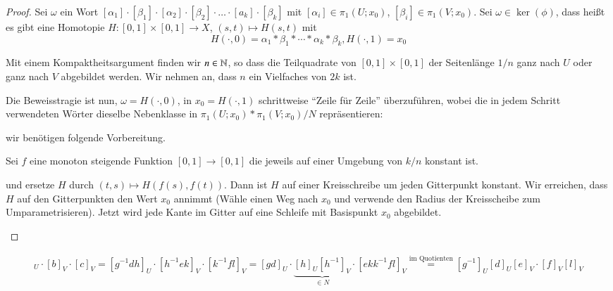 \documentclass[a4paper,10pt]{scrartcl}
\begin{document}
\begin{proof}
 Sei $\omega$ ein Wort $[\alpha_1]\cdot[\beta_1]\cdot[\alpha_2]\cdot[\beta_2]\cdot\dotsc\cdot[a_k]\cdot[\beta_k]$ mit $[\alpha_i]\in \pi_1(U;x_0)$, $[\beta_i]\in \pi_1(V;x_0)$. Sei $\omega\in \ker(\phi)$, dass heißt es gibt eine Homotopie 
$H:[0,1]\times[0,1]\to X$, $(s,t)\mapsto H(s,t)$ mit 
\[
 H(\cdot, 0)=\alpha_1*\beta_1*\dotsb *\alpha_k*\beta_k, H(\cdot, 1)=x_0
\]
\begin{figure}[H]
 \centering
\fixme[fig110]
\caption{}
\end{figure}
Mit einem Kompaktheitsargument finden wir $n\in \mathbb{N}$, so dass die Teilquadrate von $[0,1]\times[0,1]$ der Seitenlänge $1/n$ ganz nach $U$ oder ganz nach $V$ abgebildet werden. Wir nehmen an, dass $n$ ein Vielfaches von $2k$ ist.

Die Beweisstragie ist nun, $\omega=H(\cdot, 0)$, in $x_0=H(\cdot, 1)$ schrittweise "`Zeile für Zeile"' überzuführen, wobei die in jedem Schritt verwendeten Wörter dieselbe Nebenklasse in $\pi_1(U;x_0)*\pi_1(V;x_0)/N$ repräsentieren:
\begin{figure}[H]
 \centering
\fixme[fig111]
\caption{}
\end{figure} 
wir benötigen folgende Vorbereitung.

Sei $f$ eine monoton steigende Funktion $[0,1]\to[0,1]$ die jeweils auf einer Umgebung von $k/n$ konstant ist.
\begin{figure}[H]
 \centering
\fixme[fig112]
\caption{}
\end{figure}
und ersetze $H$ durch $(t,s)\mapsto H(f(s), f(t))$. Dann ist $H$ auf einer Kreisschreibe um jeden Gitterpunkt konstant.  Wir erreichen, dass $H$ auf den Gitterpunkten den Wert $x_0$ annimmt (Wähle einen Weg nach $x_0$ und verwende den Radius der Kreisscheibe zum Umparametrisieren). Jetzt wird jede Kante im Gitter auf eine Schleife mit Basispunkt $x_0$ abgebildet.
\begin{figure}[H]
 \centering
\fixme[fig113]
\caption{}
\end{figure} 
\end{proof}
\begin{ex*}
 \begin{figure}[H]
 \centering
\fixme[fig114]
\caption{}
\end{figure}
\begin{align*}
 [a]_U\cdot [b]_V\cdot [c]_V=[g^{-1}dh]_U\cdot [h^{-1} ek]_V\cdot [k^{-1}f l]_V=[gd]_U\cdot \underbrace{[h]_U[h^{-1}]_V}_{\in N}\cdot [ekk^{-1}fl]_V\stackrel{\text{im Quotienten}}=[g^{-1}]_U[d]_U[e]_V\cdot [f]_V[l]_V 
\end{align*}
\end{ex*}
\end{document}
